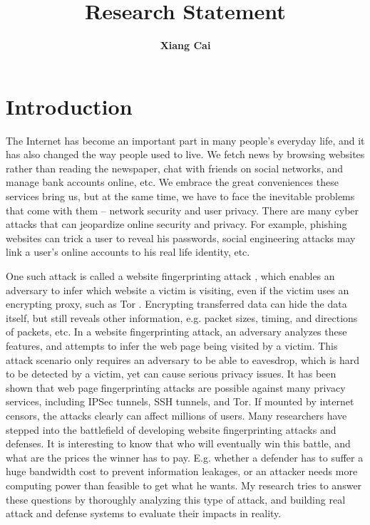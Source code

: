 \documentclass[11pt,oneside]{article}
\begin{document}
\title{\textbf{Research Statement}}
\author{\textbf{Xiang Cai}}
\date{}

\maketitle

\section{Introduction}

The Internet has become an important part in many people's everyday life, and
it has also changed the way people used to live. We fetch news by browsing
websites rather than reading the newspaper, chat with friends on social
networks, and manage bank accounts online, etc. We embrace the great
conveniences these services bring us, but at the same time, we have to face the
inevitable problems that come with them -- network security and user privacy.
There are many cyber attacks that can jeopardize online security and privacy.
For example, phishing websites can trick a user to reveal his passwords, social
engineering attacks may link a user's online accounts to his real life identity,
			etc.

One such attack is called a website fingerprinting attack \cite{hintz-pets02},
	which enables an adversary to infer which website a victim is visiting,
	even if the victim uses an encrypting proxy, such as Tor
	\cite{tor-website}. Encrypting transferred data can hide the data itself,
	but still reveals other information, e.g. packet sizes, timing, and
	directions of packets, etc. In a website fingerprinting attack, an
	adversary analyzes these features, and attempts to infer the web page being
	visited by a victim. This attack scenario only requires an adversary to be
	able to eavesdrop, which is hard to be detected by a victim, yet can cause
	serious privacy issues. It has been shown that web page fingerprinting
	attacks are possible against many privacy services, including IPSec
	tunnels, SSH tunnels, and Tor. If mounted by internet censors, the attacks
	clearly can affect millions of users. Many researchers have stepped into
	the battlefield of developing website fingerprinting attacks and defenses.
	It is interesting to know that who will eventually win this battle, and what are the
	prices the winner has to pay. E.g. whether a defender has to suffer a huge
	bandwidth cost to prevent information leakages, or an attacker needs more
	computing power than feasible to get what he wants. My research tries to
	answer these questions by thoroughly analyzing this type of attack, and
	building real attack and defense systems to evaluate their impacts in
	reality.
\end{document}
